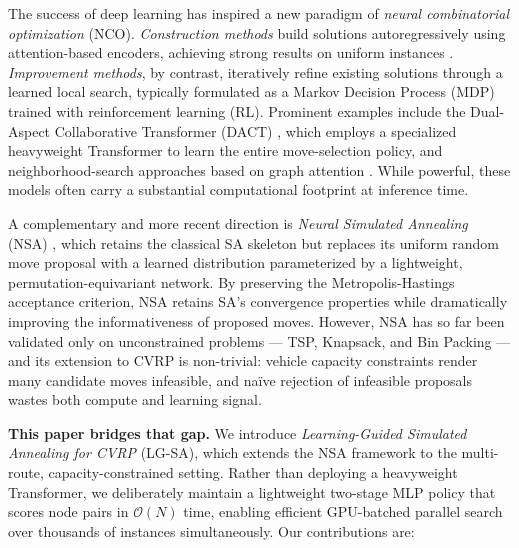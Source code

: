 \documentclass[letterpaper]{article} %
\begin{document}
The success of deep learning has inspired a new paradigm of \emph{neural combinatorial optimization} (NCO). \emph{Construction methods} build solutions autoregressively using attention-based encoders, achieving strong results on uniform instances \citep{nazari_reinforcement_2018, kool_attention_2019, kwon_pomo_2021}. \emph{Improvement methods}, by contrast, iteratively refine existing solutions through a learned local search, typically formulated as a Markov Decision Process (MDP) trained with reinforcement learning (RL). Prominent examples include the Dual-Aspect Collaborative Transformer (DACT) \citep{ma_learning_2021}, which employs a specialized heavyweight Transformer to learn the entire move-selection policy, and neighborhood-search approaches based on graph attention \citep{gao_learn_2020, wu_learning_2022}. While powerful, these models often carry a substantial computational footprint at inference time.

A complementary and more recent direction is \emph{Neural Simulated Annealing} (NSA) \citep{correia_neural_2023}, which retains the classical SA skeleton but replaces its uniform random move proposal with a learned distribution parameterized by a lightweight, permutation-equivariant network. By preserving the Metropolis-Hastings acceptance criterion, NSA retains SA's convergence properties while dramatically improving the informativeness of proposed moves. However, NSA has so far been validated only on unconstrained problems --- TSP, Knapsack, and Bin Packing --- and its extension to CVRP is non-trivial: vehicle capacity constraints render many candidate moves infeasible, and naïve rejection of infeasible proposals wastes both compute and learning signal.

\textbf{This paper bridges that gap.} We introduce \emph{Learning-Guided Simulated Annealing for CVRP} (LG-SA), which extends the NSA framework to the multi-route, capacity-constrained setting. Rather than deploying a heavyweight Transformer, we deliberately maintain a lightweight two-stage MLP policy that scores node pairs in $\mathcal{O}(N)$ time, enabling efficient GPU-batched parallel search over thousands of instances simultaneously. Our contributions are:
\end{document}

